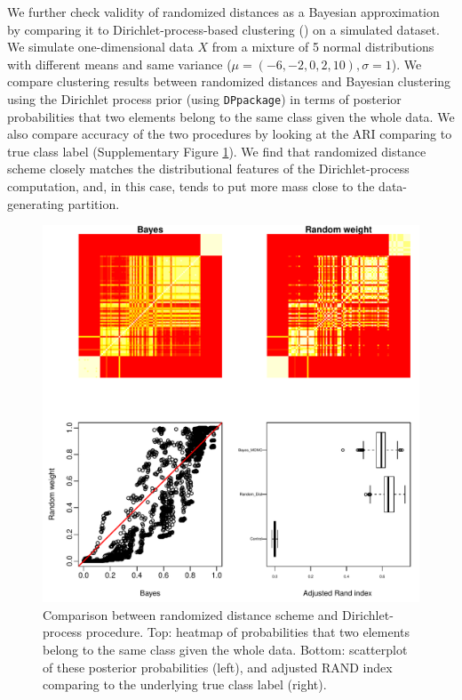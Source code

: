 \documentclass[aoas,preprint]{imsart}
\begin{document}

We further check validity of randomized distances as a Bayesian approximation
  by comparing it to Dirichlet-process-based 
clustering (\cite{JSSv040i05})  on  a simulated dataset. 
We simulate one-dimensional data $X$ from a mixture of 5 normal distributions with different means and same variance ($\mu = (-6,-2,0,2,10), \sigma = 1$). 
We compare clustering results between randomized distances and Bayesian clustering 
using the Dirichlet process prior (using  \verb+DPpackage+) 
in terms of posterior probabilities that two elements belong to the same class given the whole data. 
We also compare accuracy of the two procedures by looking at the ARI comparing to true class label (Supplementary Figure \ref{fig:simu}).  
We find that randomized distance scheme closely matches the distributional features of the Dirichlet-process
computation, and, in this case, tends to put more mass close to the data-generating partition. 

\begin{figure}[h!]
\includegraphics[scale = 0.9]{Figs/try7-g.pdf}
 \caption{Comparison between randomized distance  scheme and Dirichlet-process procedure. 
 Top: heatmap of probabilities that two elements belong to the same class given the whole data. Bottom: scatterplot of these posterior probabilities (left), and adjusted RAND index comparing to the underlying true class label (right).}
  \label{fig:simu}
\end{figure}
\end{document}
